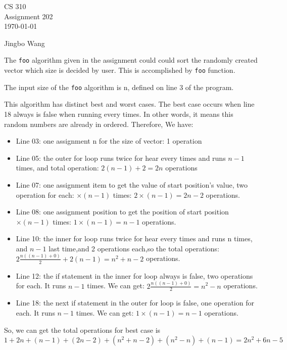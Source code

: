 \documentclass[11pt]{article}
\newcommand{\name}{Jingbo Wang}
\begin{document}
\thispagestyle{empty}

\begin{center}
{\large CS 310}\\
Assignment 202\\
\today
\end{center}

\begin{flushright}
\name{}
\end{flushright}

The \texttt{foo} algorithm given in the assignment could could sort the
randomly created vector which size is decided by user.
This is accomplished by \texttt{foo} function.

The input size of the \texttt{foo} algorithm is n, defined on line 3 of
the program.

This algorithm has distinct best and worst cases. The best case
occurs when line 18 always is false when running every times. In other
words, it means this random numbers are already in ordered.
Therefore, We have:
\begin{itemize}
 \item Line 03: one assignment n for the size of vector: 1 operation
 \item Line 05: the outer for loop runs twice for hear every times
                  and runs $n - 1$ times, and total operation:
                  $2(n-1) + 2 = 2n$ operations
 \item Line 07: one assignment item to get the value of start
                  position's value, two operation for each:
                  $\times (n - 1)$ times: $2 \times (n - 1) = 2n - 2$
                  operations.
 \item Line 08: one assignment position to get the position of start
                  position$\times (n - 1)$ times: $1 \times (n - 1)
                  = n - 1$ operations.
 \item Line 10: the inner for loop runs twice for hear every times
                  and runs n times, and $n - 1$ last time,and 2
                  operations each,so the total operations:
                  $2\frac{n((n-1) + 0)}{2} + 2(n - 1)= n^{2} + n - 2$
                  operations.
 \item Line 12: the if statement in the inner for loop always is
                  false, two operations for each. It runs $n-1$
                  times. We can get: $2\frac{n((n-1) + 0)}{2} =
                  n^{2} - n$ operations.
 \item Line 18: the next if statement in the outer for loop is false,
                  one operation for each. It runs $n - 1$ times.
                  We can get: $1 \times (n - 1) = n - 1$ operations.
\end{itemize}
So, we can get the total operations for best case is $1 + 2n +
    (n - 1) + (2n - 2)+ (n^{2} + n - 2) + (n^{2} - n) + (n - 1)
    = 2n^{2} + 6n - 5$
\end{document}
